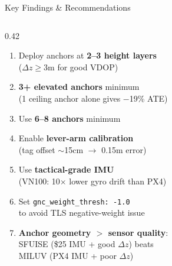 \documentclass[10pt,aspectratio=169]{beamer}
\begin{document}
\begin{frame}{Key Findings \& Recommendations}
\begin{columns}
\begin{column}{0.42\textwidth}
\vspace{0.1cm}
\begin{enumerate}\setlength{\itemsep}{6pt}\footnotesize
    \item Deploy anchors at \textbf{2--3 height layers}\\
    ($\Delta z \geq 3$m for good VDOP)
    \item \textbf{3+ elevated anchors} minimum\\
    (1 ceiling anchor alone gives $-$19\% ATE)
    \item Use \textbf{6--8 anchors} minimum
    \item Enable \textbf{lever-arm calibration}\\
    (tag offset $\sim$15cm $\to$ 0.15m error)
    \item Use \textbf{tactical-grade IMU}\\
    (VN100: 10$\times$ lower gyro drift than PX4)
    \item Set \texttt{gnc\_weight\_thresh: -1.0}\\
    to avoid TLS negative-weight issue
    \item \textbf{Anchor geometry $>$ sensor quality}:\\
    SFUISE (\$25 IMU + good $\Delta z$) beats\\
    MILUV (PX4 IMU + poor $\Delta z$)
\end{enumerate}
\end{column}
\end{columns}
\end{frame}
\end{document}
